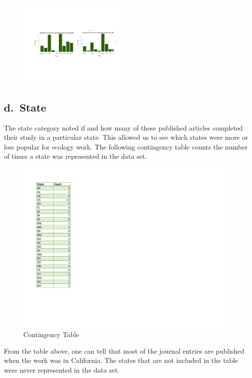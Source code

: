 \documentclass[
]{article}
\begin{document}
\begin{figure}
    \centering
    \includegraphics[width=0.50\textwidth]{Regions2BarGraph.pdf}
    \label{fig:Continent Bar Graph}
\end{figure}

\hypertarget{d.-state}{%
\subsection{d.~State}\label{d.-state}}

The state category noted if and how many of these published articles
completed their study in a particular state. This allowed us to see
which states were more or less popular for ecology work. The following
contingency table counts the number of times a state was represented in
the data set.

\begin{figure}
  \caption{Contingency Table}
    \includegraphics[width=13cm]{statetable.pdf}
\end{figure}

From the table above, one can tell that most of the journal entries are
published when the work was in California. The states that are not
included in the table were never represented in the data set.
\end{document}
